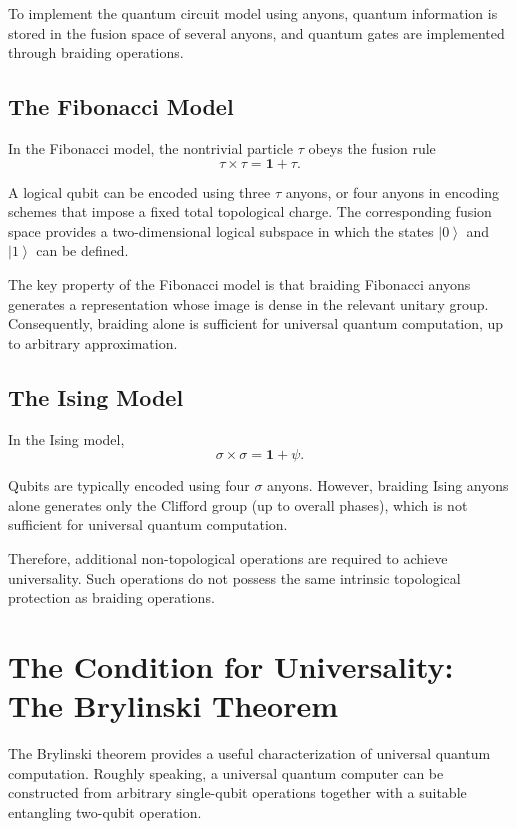 \documentclass[11pt]{article}
\begin{document}
	To implement the quantum circuit model using anyons, quantum information is stored in the fusion space of several anyons, and quantum gates are implemented through braiding operations.
	
	\subsection{The Fibonacci Model}
	
	In the Fibonacci model, the nontrivial particle $\tau$ obeys the fusion rule
	\[
	\tau\times\tau=\mathbf{1}+\tau.
	\]
	
	A logical qubit can be encoded using three $\tau$ anyons, or four anyons in encoding schemes that impose a fixed total topological charge. The corresponding fusion space provides a two-dimensional logical subspace in which the states $\left|0\right\rangle$ and $\left|1\right\rangle$ can be defined.
	
	The key property of the Fibonacci model is that braiding Fibonacci anyons generates a representation whose image is dense in the relevant unitary group. Consequently, braiding alone is sufficient for universal quantum computation, up to arbitrary approximation.
	
	\subsection{The Ising Model}
	
	In the Ising model,
	\[
	\sigma\times\sigma=\mathbf{1}+\psi.
	\]
	
	Qubits are typically encoded using four $\sigma$ anyons. However, braiding Ising anyons alone generates only the Clifford group (up to overall phases), which is not sufficient for universal quantum computation.
	
	Therefore, additional non-topological operations are required to achieve universality. Such operations do not possess the same intrinsic topological protection as braiding operations.
	
	
	\section{The Condition for Universality: The Brylinski Theorem}
	
	The Brylinski theorem provides a useful characterization of universal quantum computation. Roughly speaking, a universal quantum computer can be constructed from arbitrary single-qubit operations together with a suitable entangling two-qubit operation.
	
\end{document}
